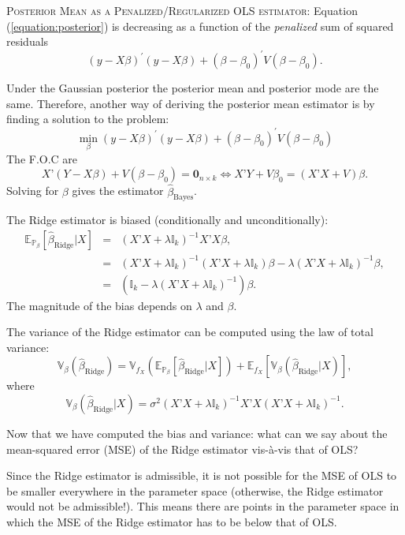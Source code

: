 \documentclass[11pt]{article} %
\begin{document}
{\scshape Posterior Mean as a Penalized/Regularized OLS estimator:} \noindent Equation (\ref{equation:posterior}) is decreasing as a function of the \emph{penalized} sum of squared residuals 
\[ (y-X\beta)^{\prime} (y-X \beta) + (\beta-\beta_0)^{\prime} V (\beta-\beta_0). \]


\noindent Under the Gaussian posterior the posterior mean and posterior mode are the same. Therefore, another way of deriving the posterior mean estimator is by finding a solution to the problem:
\[ \min_{\beta} (y-X\beta)^{\prime} (y-X \beta) + (\beta-\beta_0)^{\prime} V (\beta-\beta_0) \]
The F.O.C are 
\[ X’(Y-X\beta) + V(\beta - \beta_0) = \textbf{0}_{n \times k} \iff  X’Y + V \beta_0 = (X’X + V) \beta. \]
\noindent Solving for $\beta$ gives the estimator $\widehat{\beta}_{\textrm{Bayes}}$. 



The Ridge estimator is biased (conditionally and unconditionally):
\begin{eqnarray*}
\mathbb{E}_{\mathbb{P}_{\beta}} [ \widehat{\beta}_{\textrm{Ridge}} | X ]  &=& (X’X + \lambda \mathbb{I}_{k})^{-1} X’X\beta,  \\
&=& (X’X + \lambda \mathbb{I}_{k})^{-1} (X’X + \lambda \mathbb{I}_{k}) \beta - \lambda (X’X + \lambda \mathbb{I}_{k})^{-1}  \beta, \\
&=& (\mathbb{I}_k-\lambda (X’X + \lambda \mathbb{I}_k)^{-1}) \beta.
\end{eqnarray*}
\noindent The magnitude of the bias depends on $\lambda$ and $\beta$. 

The variance of the Ridge estimator can be computed using the law of total variance:
\[ \mathbb{V}_{\beta} (\widehat{\beta}_{\textrm{Ridge}}) =  \mathbb{V}_{f_X} \left(  \mathbb{E}_{\mathbb{P}_{\beta}} [ \widehat{\beta}_{\textrm{Ridge}} | X ]  \right)  + \mathbb{E}_{f_X}  \left[  \mathbb{V}_{\beta} (\widehat{\beta}_{\textrm{Ridge}} | X)  \right],     \]
where 
\[ \mathbb{V}_{\beta} (\widehat{\beta}_{\textrm{Ridge}} | X) = \sigma^2( X’X + \lambda \mathbb{I}_k)^{-1} X’X ( X’X + \lambda \mathbb{I}_k)^{-1}.  \]

\noindent Now that we have computed the bias and variance: what can we say about the mean-squared error (MSE) of the Ridge estimator vis-\`a-vis that of OLS? 

Since the Ridge estimator is admissible, it is not possible for the MSE of OLS to be smaller everywhere in the parameter space (otherwise, the Ridge estimator would not be admissible!). This means there are points in the parameter space in which the MSE of the Ridge estimator has to be below that of OLS. 
\end{document}
